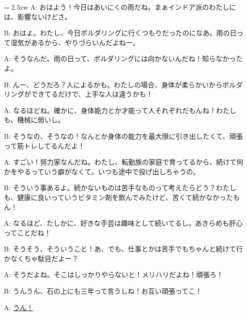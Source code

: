 \documentclass[11pt]{amsart}
\title{}
\author{}
\newenvironment{hangall}[1]{\hangindent = 2.5zw\everypar{\hangindent = 2.5zw}}{}
\begin{document}
\maketitle
\begin{hangall}{}%
A: おはよう！今日はあいにくの雨だね。まぁインドア派のわたしには、影響ないけどさ。

B: おはよ。わたし、今日ボルダリングに行くつもりだったのになあ。雨の日って湿気があるから、やりづらいんだよねー。

A: そうなんだ。雨の日って、ボルダリングには向かないんだね！知らなかったよ。

B: んー、どうだろ？人によるかも。わたしの場合、身体が柔らかいからボルダリングができてるだけで、上手な人は違うかも！

A: なるほどね。確かに、身体能力とか才能って人それぞれだもんね！わたしも、機械に弱いし。

B: そうなの、そうなの！なんとか身体の能力を最大限に引き出したくて、頑張って筋トレしてるんだよ！

A: すごい！努力家なんだね。わたし、転勤族の家庭で育ってるから、続けて何かをやるっていう癖がなくて。いつも途中で投げ出しちゃうの。

B: そういう事あるよ。続かないものは苦手なものって考えたらどう？わたしも、健康に良いっていうビタミン剤を飲んでみたけど、苦くて続かなかったもん！

A: なるほど、たしかに、好きな手芸は趣味として続いてるし。あきらめも肝心ってことだね！

B: そうそう、そういうこと！あ、でも、仕事とかは苦手でもちゃんと続けて行かなくちゃ駄目だよー？

A: そうだよね。そこはしっかりやらないと！メリハリだよね！頑張ろ！

B: うんうん、石の上にも三年って言うしね！お互い頑張ってこ！

A: \ul{うん！}\end{hangall}
\end{document}
